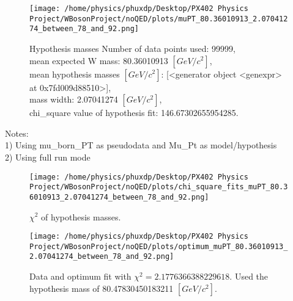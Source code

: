\documentclass[12pt]{article}
\begin{document}
	\begin{figure}[tb]
		\centering
		\texttt{[image: /home/physics/phuxdp/Desktop/PX402 Physics Project/WBosonProject/noQED/plots/muPT\_80.36010913\_2.07041274\_between\_78\_and\_92.png]}
		\caption{\small Hypothesis masses Number of data points used: 99999,\\
mean expected W mass: 80.36010913 $[GeV/c^{2}]$,\\
mean hypothesis masses $[GeV/c^{2}]$: [<generator object <genexpr> at 0x7fd009d88510>],\\
mass width: 2.07041274 $[GeV/c^{2}]$,\\
chi_square value of hypothesis fit: 146.67302655954285. }
		\label{fig: fig_0}
	\end{figure}
    Notes: \\
    1) Using mu\_born\_PT as pseudodata and  Mu\_Pt as model/hypothesis\\
    2) Using full run mode\\
       \begin{figure}[tb]
		\centering
		\texttt{[image: /home/physics/phuxdp/Desktop/PX402 Physics Project/WBosonProject/noQED/plots/chi\_square\_fits\_muPT\_80.36010913\_2.07041274\_between\_78\_and\_92.png]}
		\caption{\small $\chi^2$ of hypothesis masses. }
		\label{fig: fig_chi_square}
	\end{figure}

    \begin{figure}[tb]
		\centering
		\texttt{[image: /home/physics/phuxdp/Desktop/PX402 Physics Project/WBosonProject/noQED/plots/optimum\_muPT\_80.36010913\_2.07041274\_between\_78\_and\_92.png]}
		\caption{\small Data and optimum fit with $\chi^2 = 2.1776366388229618$. Used the hypothesis mass of 80.47830450183211 $[GeV/c^{2}]$. }
		\label{fig: fig_optim_parms}
	\end{figure}
    
\end{document}
